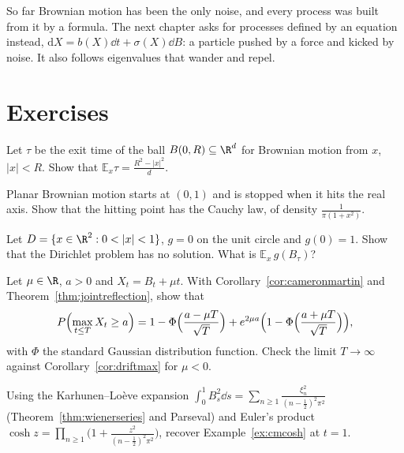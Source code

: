 So far Brownian motion has been the only noise, and every process was built from it by a formula. The next chapter asks for processes defined by an
equation instead, $\mathrm dX=b(X)\dd t+\sigma(X)\dd B$: a particle pushed by a force and kicked by noise. It also follows eigenvalues that wander and repel.

\section{Exercises}

\begin{exercise}[$\star$]\label{ex:ballexit}
Let $\tau$ be the exit time of the ball $B(0,R)\subseteq\R^d$ for Brownian motion from $x$, $|x|<R$. Show that $\mathbb E_x\tau=\frac{R^2-|x|^2}d$.
\end{exercise}

\begin{exercise}[$\star$]\label{ex:halfplane}
Planar Brownian motion starts at $(0,1)$ and is stopped when it hits the real axis. Show that the hitting point has the Cauchy law, of density $\frac1{\pi(1+x^2)}$.
\end{exercise}

\begin{exercise}[$\star$]\label{ex:zaremba}
Let $D=\{x\in\R^2:0<|x|<1\}$, $g=0$ on the unit circle and $g(0)=1$. Show that the Dirichlet problem has no solution. What is $\mathbb E_x\,g(B_\tau)$?
\end{exercise}

\begin{exercise}[$\star\star$]\label{ex:driftmax}
Let $\mu\in\R$, $a>0$ and $X_t=B_t+\mu t$. With Corollary~\ref{cor:cameronmartin} and Theorem~\ref{thm:jointreflection}, show that
\[
P\Bigl(\max_{t\le T}X_t\ge a\Bigr)=1-\Phi\Bigl(\frac{a-\mu T}{\sqrt T}\Bigr)+e^{2\mu a}\Bigl(1-\Phi\Bigl(\frac{a+\mu T}{\sqrt T}\Bigr)\Bigr),
\]
with $\Phi$ the standard Gaussian distribution function. Check the limit $T\to\infty$ against Corollary~\ref{cor:driftmax} for $\mu<0$.
\end{exercise}

\begin{exercise}[$\star\star$]\label{ex:cmproduct}
Using the Karhunen--Lo\`eve expansion $\int_0^1B_s^2\dd s=\sum_{n\ge1}\frac{\xi_n^2}{(n-\frac12)^2\pi^2}$ (Theorem~\ref{thm:wienerseries} and Parseval) and Euler's product $\cosh z=\prod_{n\ge1}\bigl(1+\frac{z^2}{(n-\frac12)^2\pi^2}\bigr)$, recover
Example~\ref{ex:cmcosh} at $t=1$.
\end{exercise}


